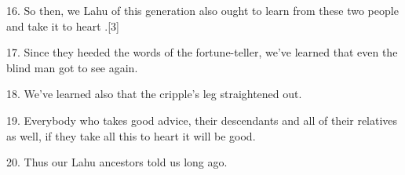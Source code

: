 {\LARGE{}16. So then, we Lahu of this generation also ought to learn from these
two people and take it to heart .[3]}

{\LARGE{}17. Since they heeded the words of the fortune-teller, we've learned that
even the blind man got to see again.}

{\LARGE{}18. We've learned also that the cripple's leg straightened out.}

{\LARGE{}19. Everybody who takes good advice, their descendants and all of their
relatives as well, if they take all this to heart it will be good.}

{\LARGE{}20. Thus our Lahu ancestors told us long ago.}

